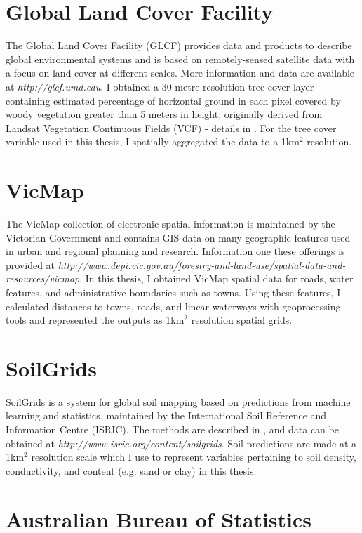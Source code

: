 \section{Global Land Cover Facility}

The Global Land Cover Facility (GLCF) provides data and products to describe global environmental systems and is based on remotely-sensed satellite data with a focus on land cover at different scales. More information and data are available at \textit{http://glcf.umd.edu}. I obtained a 30-metre resolution tree cover layer containing estimated percentage of horizontal ground in each pixel covered by woody vegetation greater than 5 meters in height; originally derived from Landsat Vegetation Continuous Fields (VCF) - details in \cite{sext13}. For the tree cover variable used in this thesis, I spatially aggregated the data to a 1km$^2$ resolution.

\section{VicMap}

The VicMap collection of electronic spatial information is maintained by the Victorian Government and contains GIS data on many geographic features used in urban and regional planning and research. Information one these offerings is provided at \textit{http://www.depi.vic.gov.au/forestry-and-land-use/spatial-data-and-resources/vicmap}. In this thesis, I obtained VicMap spatial data for roads, water features, and administrative boundaries such as towns. Using these features, I calculated distances to towns, roads, and linear waterways with geoprocessing tools and represented the outputs as 1km$^2$ resolution spatial grids.

\section{SoilGrids}

SoilGrids is a system for global soil mapping based on predictions from machine learning and statistics, maintained by the International Soil Reference and Information Centre (ISRIC). The methods are described in \cite{heng14}, and data can be obtained at \textit{http://www.isric.org/content/soilgrids}. Soil predictions are made at a 1km$^2$ resolution scale which I use to represent variables pertaining to soil density, conductivity, and content (e.g. sand or clay) in this thesis.

\section{Australian Bureau of Statistics}

